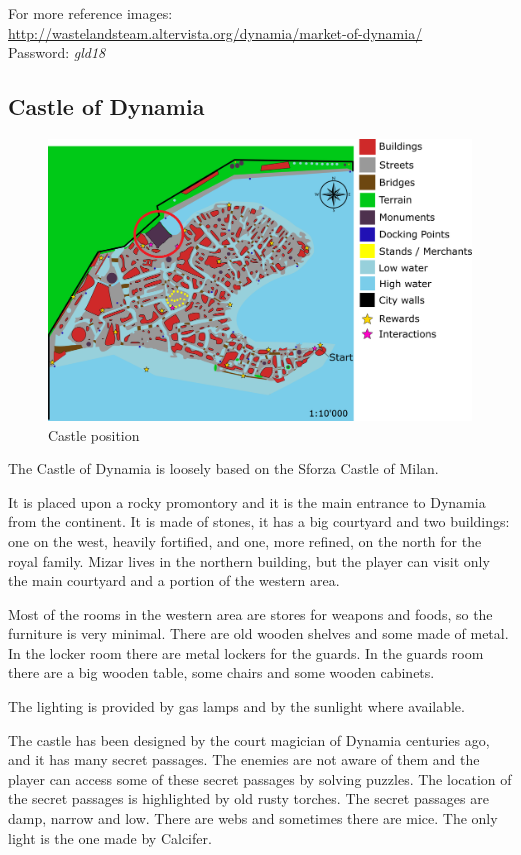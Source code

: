 For more reference images: \url{http://wastelandsteam.altervista.org/dynamia/market-of-dynamia/}\\
Password: \textit{gld18}

\subsection{Castle of Dynamia}
\begin{figure}[H]
  \centering
  \includegraphics[width=\textwidth]{Images/Maps/dynamia_castleOfDynamia}
  \caption{Castle position}
\end{figure}

The Castle of Dynamia is loosely based on the Sforza Castle of Milan.

It is placed upon a rocky promontory and it is the main entrance to Dynamia from the continent. It is made of stones, it has a big courtyard and two buildings: one on the west, heavily fortified, and one, more refined, on the north for the royal family. Mizar lives in the northern building, but the player can visit only the main courtyard and a portion of the western area.

Most of the rooms in the western area are stores for weapons and foods, so the furniture is very minimal. There are old wooden shelves and some made of metal. In the locker room there are metal lockers for the guards. In the guards room there are a big wooden table, some chairs and some wooden cabinets.

The lighting is provided by gas lamps and by the sunlight where available.

The castle has been designed by the court magician of Dynamia centuries ago, and it has many secret passages. The enemies are not aware of them and the player can access some of these secret passages by solving puzzles. The location of the secret passages is highlighted by old rusty torches. The secret passages are damp, narrow and low. There are webs and sometimes there are mice. The only light is the one made by Calcifer.

